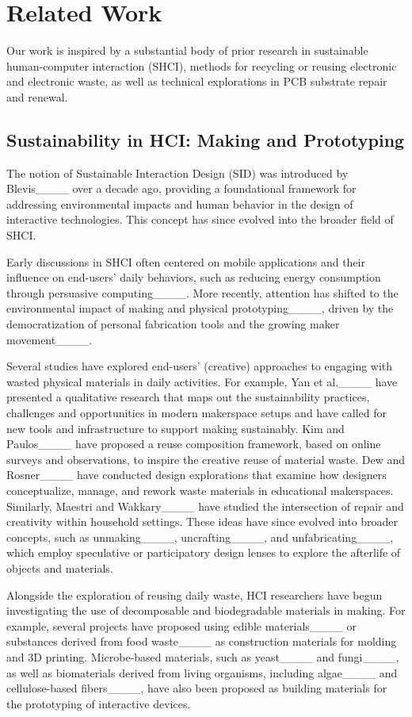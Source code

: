 \section{Related Work}
Our work is inspired by a substantial body of prior research in sustainable human-computer interaction (SHCI), methods for recycling or reusing electronic and electronic waste, as well as technical explorations in PCB substrate repair and renewal.

\subsection{Sustainability in HCI: Making and Prototyping}

The notion of Sustainable Interaction Design (SID) was introduced by Blevis____ over a decade ago, providing a foundational framework for addressing environmental impacts and human behavior in the design of interactive technologies. 
This concept has since evolved into the broader field of SHCI.

Early discussions in SHCI often centered on mobile applications and their influence on end-users' daily behaviors, such as reducing energy consumption through persuasive computing____. 
More recently, attention has shifted to the environmental impact of making and physical prototyping____, driven by the democratization of personal fabrication tools and the growing maker movement____.

Several studies have explored end-users' (creative) approaches to engaging with wasted physical materials in daily activities. 
For example, Yan et al.____ have presented a qualitative research that maps out the sustainability practices, challenges and opportunities in modern makerspace setups and have called for new tools and infrastructure to support making sustainably. Kim and Paulos____ have proposed a reuse composition framework, based on online surveys and observations, to inspire the creative reuse of material waste. 
Dew and Rosner____ have conducted design explorations that examine how designers conceptualize, manage, and rework waste materials in educational makerspaces. 
Similarly, Maestri and Wakkary____ have studied the intersection of repair and creativity within household settings. 
These ideas have since evolved into broader concepts, such as unmaking____, uncrafting____, and unfabricating____, which employ speculative or participatory design lenses to explore the afterlife of objects and materials.


Alongside the exploration of reusing daily waste, HCI researchers have begun investigating the use of decomposable and biodegradable materials in making. 
For example, several projects have proposed using edible materials____ or substances derived from food waste____ as construction materials for molding and 3D printing. 
Microbe-based materials, such as yeast____ and fungi____, as well as biomaterials derived from living organisms, including algae____ and cellulose-based fibers____, have also been proposed as building materials for the prototyping of interactive devices. 

